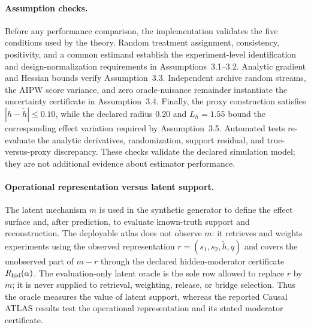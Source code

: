 \documentclass[11pt]{article}
\numberwithin{equation}{section}
\newcommand{\1}{\mathbf 1}
\begin{document}
\paragraph{Assumption checks.}
Before any performance comparison, the implementation validates the five conditions used by the theory.  Random treatment assignment, consistency, positivity, and a common estimand establish the experiment-level identification and design-normalization requirements in Assumptions~3.1--3.2.  Analytic gradient and Hessian bounds verify Assumption~3.3.  Independent archive random streams, the AIPW score variance, and zero oracle-nuisance remainder instantiate the uncertainty certificate in Assumption~3.4.  Finally, the proxy construction satisfies $|h-\widetilde h|\le 0.10$, while the declared radius $0.20$ and $L_h=1.55$ bound the corresponding effect variation required by Assumption~3.5.  Automated tests re-evaluate the analytic derivatives, randomization, support residual, and true-versus-proxy discrepancy.  These checks validate the declared simulation model; they are not additional evidence about estimator performance.

\paragraph{Operational representation versus latent support.}
The latent mechanism $m$ is used in the synthetic generator to define the effect surface and, after prediction, to evaluate known-truth support and reconstruction.  The deployable atlas does not observe $m$: it retrieves and weights experiments using the observed representation $r=(s_1,s_2,\widetilde h,q)$ and covers the unobserved part of $m-r$ through the declared hidden-moderator certificate $R_{\rm hid}(\alpha)$.  The evaluation-only latent oracle is the sole row allowed to replace $r$ by $m$; it is never supplied to retrieval, weighting, release, or bridge selection.  Thus the oracle measures the value of latent support, whereas the reported Causal ATLAS results test the operational representation and its stated moderator certificate.
\end{document}
